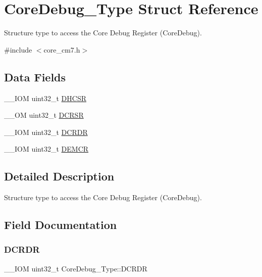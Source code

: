 \hypertarget{structCoreDebug__Type}{}\section{Core\+Debug\+\_\+\+Type Struct Reference}
\label{structCoreDebug__Type}


Structure type to access the Core Debug Register (Core\+Debug).  




{\ttfamily \#include $<$core\+\_\+cm7.\+h$>$}

\subsection*{Data Fields}
\begin{DoxyCompactItemize}
\item 
\+\_\+\+\_\+\+I\+OM uint32\+\_\+t \mbox{\hyperlink{structCoreDebug__Type_ad63554e4650da91a8e79929cbb63db66}{D\+H\+C\+SR}}
\item 
\+\_\+\+\_\+\+OM uint32\+\_\+t \mbox{\hyperlink{structCoreDebug__Type_af907cf64577eaf927dac6787df6dd98b}{D\+C\+R\+SR}}
\item 
\+\_\+\+\_\+\+I\+OM uint32\+\_\+t \mbox{\hyperlink{structCoreDebug__Type_aab3cc92ef07bc1f04b3a3aa6db2c2d55}{D\+C\+R\+DR}}
\item 
\+\_\+\+\_\+\+I\+OM uint32\+\_\+t \mbox{\hyperlink{structCoreDebug__Type_aeb3126abc4c258a858f21f356c0df6ee}{D\+E\+M\+CR}}
\end{DoxyCompactItemize}


\subsection{Detailed Description}
Structure type to access the Core Debug Register (Core\+Debug). 

\subsection{Field Documentation}
\mbox{\label{structCoreDebug__Type_aab3cc92ef07bc1f04b3a3aa6db2c2d55}} 
\subsubsection{\texorpdfstring{DCRDR}{DCRDR}}
{\footnotesize\ttfamily \+\_\+\+\_\+\+I\+OM uint32\+\_\+t Core\+Debug\+\_\+\+Type\+::\+D\+C\+R\+DR}

